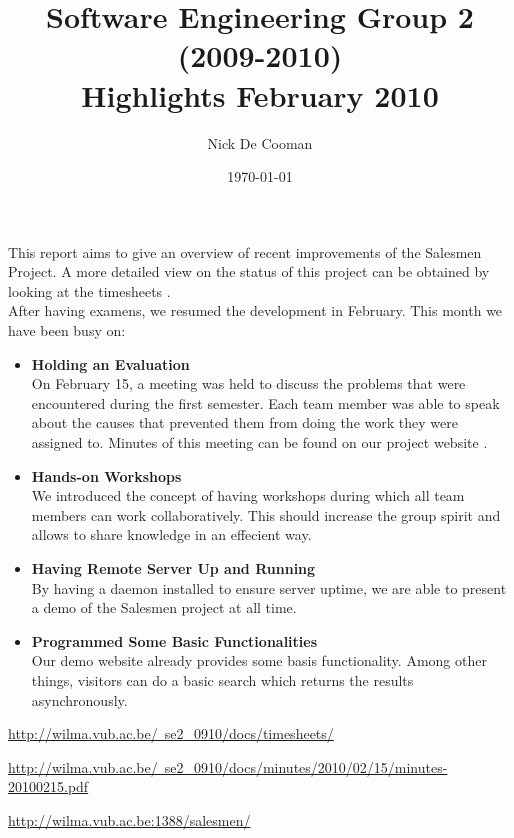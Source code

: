 \documentclass{article}
\begin{document}
	\title{Software Engineering Group 2 (2009-2010) \\ Highlights February 2010}
	\author{Nick De Cooman}
	\date{\today}

\maketitle

This report aims to give an overview of recent improvements of the Salesmen Project. A more detailed view on the status of this project can be obtained by looking at the timesheets \cite{timesheets}. \\

After having examens, we resumed the development in February. This month we have been busy on:

\begin{itemize}
	
	\item \textbf{Holding an Evaluation} \\
	On February 15, a meeting was held to discuss the problems that were encountered during the first semester. Each team member was able to speak about the causes that prevented them from doing the work they were assigned to. Minutes of this meeting can be found on our project website \cite{eval}.
	
	\item \textbf{Hands-on Workshops} \\
	We introduced the concept of having workshops during which all team members can work collaboratively. This should increase the group spirit and allows to share knowledge in an  effecient way. 
	
	\item \textbf{Having Remote Server Up and Running} \\
	By having a daemon installed to ensure server uptime, we are able to present a demo \cite{demo} of the Salesmen project at all time. 

	\item \textbf{Programmed Some Basic Functionalities} \\
	Our demo website already provides some basis functionality. Among other things, visitors can do a basic search which returns the results asynchronously. 

\end{itemize}

\begin{thebibliography}{99}

	\href{http://wilma.vub.ac.be/~se2_0910/docs/timesheets/}{http://wilma.vub.ac.be/~se2_0910/docs/timesheets/}
	
	\href{http://wilma.vub.ac.be/~se2_0910/docs/minutes/2010/02/15/minutes-20100215.pdf}{http://wilma.vub.ac.be/~se2_0910/docs/minutes/2010/02/15/minutes-20100215.pdf}
	
	\href{http://wilma.vub.ac.be:1388/salesmen/}{http://wilma.vub.ac.be:1388/salesmen/}	
\end{thebibliography}
\end{document}
